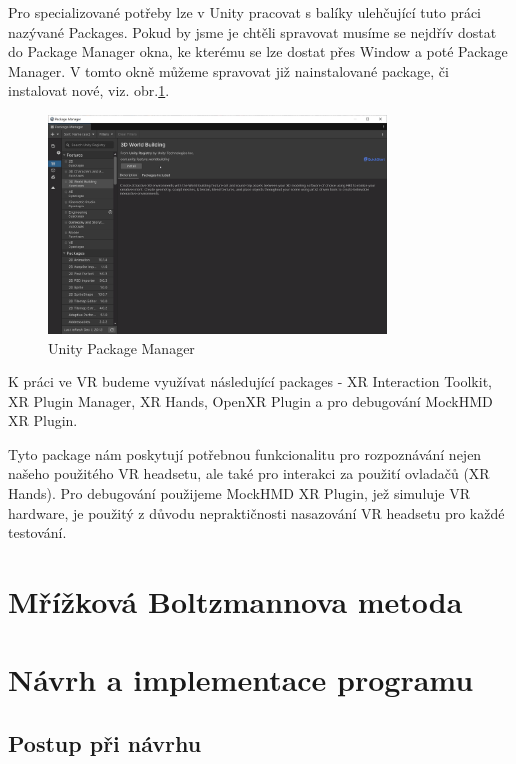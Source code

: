 \documentclass[a4paper,oneside,12pt]{book}
\begin{document}
Pro specializované potřeby lze v Unity pracovat s balíky ulehčující tuto práci nazývané Packages. Pokud by jsme je chtěli spravovat musíme se nejdřív dostat do Package Manager okna, ke kterému se lze dostat přes Window a poté Package Manager. V tomto okně můžeme spravovat již nainstalované package, či instalovat nové, viz. obr.\ref{fig:unity_package_manager}.

\begin{figure}[H]
	\centering
	\includegraphics[width=0.8\textwidth]{obrazky/unity_package_manager.png}
	\caption{Unity Package Manager}
	\label{fig:unity_package_manager}
\end{figure}

K práci ve VR budeme využívat následující packages - XR Interaction Toolkit, XR Plugin Manager, XR Hands, OpenXR Plugin a pro debugování MockHMD XR Plugin.

Tyto package nám poskytují potřebnou funkcionalitu pro rozpoznávání nejen našeho použitého VR headsetu, ale také pro interakci za použití ovladačů (XR Hands). Pro debugování použijeme MockHMD XR Plugin, jež simuluje VR hardware, je použitý z důvodu nepraktičnosti nasazování VR headsetu pro každé testování.



\chapter{Mřížková Boltzmannova metoda}

\chapter{Návrh a implementace programu}
\section{Postup při návrhu}
\end{document}
